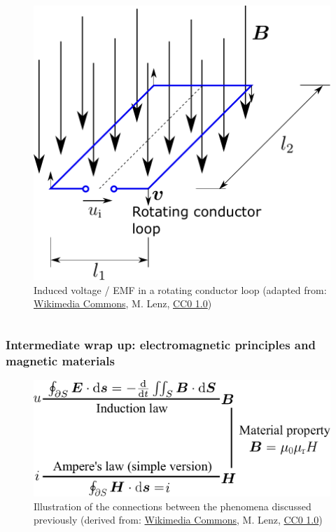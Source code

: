 \begin{frame}
\begin{columns}
\begin{column}{0.45\textwidth}
\begin{figure}
				\includegraphics[height=0.6\textheight]{fig/lec02/Conductor_loop_induction.pdf}
				\caption{Induced voltage / EMF in a rotating conductor loop (adapted from: \href{https://commons.wikimedia.org/wiki/File:Leiterschleife.svg}{Wikimedia Commons}, M. Lenz, \href{https://creativecommons.org/publicdomain/zero/1.0/deed.en}{CC0 1.0})}
			\end{figure}
		\end{column}
		\end{columns}
\end{frame}

\begin{frame}
	\frametitle{Intermediate wrap up: electromagnetic principles and magnetic materials }
    \begin{figure}
        \centering
        \includegraphics[height=0.5\textheight]{fig/lec02/Induction_material_ampere.pdf}
        \caption{Illustration of the connections between the phenomena discussed previously (derived from: \href{https://de.wikipedia.org/wiki/Datei:Kausalität.svg}{Wikimedia Commons}, M. Lenz, \href{https://creativecommons.org/publicdomain/zero/1.0/deed.de}{CC0 1.0})}
    \end{figure}
\end{frame}

